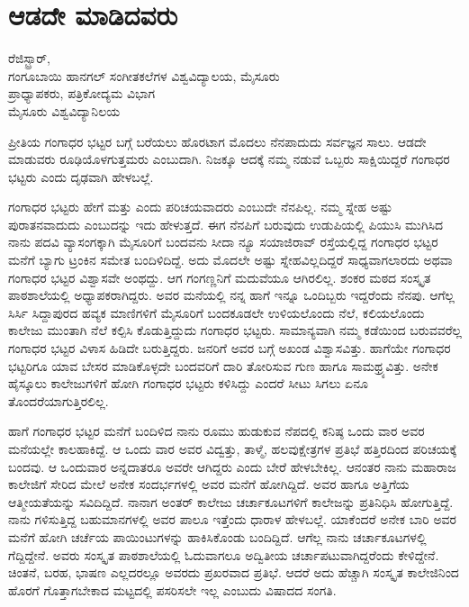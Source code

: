 {\fontsize{14}{16}\selectfont
\chapter{ಆಡದೇ ಮಾಡಿದವರು}

\begin{center}
\smallskip

ರೆಜಿಸ್ಟ್ರಾರ್, \\ಗಂಗೂಬಾಯಿ ಹಾನಗಲ್ ಸಂಗೀತಕಲೆಗಳ ವಿಶ್ವವಿದ್ಯಾಲಯ, ಮೈಸೂರು\\
ಪ್ರಾಧ್ಯಾಪಕರು, ಪತ್ರಿಕೋದ್ಯಮ ವಿಭಾಗ\\
ಮೈಸೂರು ವಿಶ್ವವಿದ್ಯಾನಿಲಯ
\addrule
\end{center}

ಪ್ರೀತಿಯ ಗಂಗಾಧರ ಭಟ್ಟರ ಬಗ್ಗೆ ಬರೆಯಲು ಹೊರಟಾಗ ಮೊದಲು ನೆನಪಾದುದು ಸರ್ವಜ್ಞನ ಸಾಲು. ಆಡದೇ ಮಾಡುವರು ರೂಢಿಯೊಳಗುತ್ತಮರು ಎಂಬುದಾಗಿ. ನಿಜಕ್ಕೂ ಆದಕ್ಕೆ ನಮ್ಮ ನಡುವೆ ಒಬ್ಬರು ಸಾಕ್ಷಿಯಿದ್ದರೆ ಗಂಗಾಧರ ಭಟ್ಟರು ಎಂದು ದೃಢವಾಗಿ ಹೇಳಬಲ್ಲೆ.

ಗಂಗಾಧರ ಭಟ್ಟರು ಹೇಗೆ ಮತ್ತು ಎಂದು ಪರಿಚಯವಾದರು ಎಂಬುದೇ ನೆನಪಿಲ್ಲ. ನಮ್ಮ ಸ್ನೇಹ ಅಷ್ಟು ಪುರಾತನವಾದುದು ಎಂಬುದನ್ನು ಇದು ಹೇಳುತ್ತದೆ. ಈಗ ನೆನಪಿಗೆ ಬರುವುದು ಉಡುಪಿಯಲ್ಲಿ ಪಿಯುಸಿ ಮುಗಿಸಿದ ನಾನು ಪದವಿ ವ್ಯಾಸಂಗಕ್ಕಾಗಿ ಮೈಸೂರಿಗೆ ಬಂದವನು ಸೀದಾ ನ್ಯೂ ಸಯಾಜಿರಾವ್ ರಸ್ತೆಯಲ್ಲಿದ್ದ ಗಂಗಾಧರ ಭಟ್ಟರ ಮನೆಗೆ ಬ್ಯಾಗು ಟ್ರಂಕಿನ ಸಮೇತ ಬಂದಿಳಿದಿದ್ದೆ. ಅದು ಮೊದಲೇ ಅಷ್ಟು ಸ್ನೇಹವಿಲ್ಲದಿದ್ದರೆ ಸಾಧ್ಯವಾಗಲಾರದು ಅಥವಾ ಗಂಗಾಧರ ಭಟ್ಟರ ವಿಶ್ವಾಸವೇ ಅಂಥದ್ದು. ಆಗ ಗಂಗಣ್ಣನಿಗೆ ಮದುವೆಯೂ ಆಗಿರಲಿಲ್ಲ. ಶಂಕರ ಮಠದ ಸಂಸ್ಕೃತ ಪಾಠಶಾಲೆಯಲ್ಲಿ ಅಧ್ಯಾಪಕರಾಗಿದ್ದರು. ಅವರ ಮನೆಯಲ್ಲಿ ನನ್ನ ಹಾಗೆ ಇನ್ನೂ ಒಂದಿಬ್ಬರು ಇದ್ದರೆಂದು ನೆನಪು. ಆಗೆಲ್ಲ ಸಿರ್ಸಿ  \enginline{-}  ಸಿದ್ದಾಪುರದ ಹವ್ಯಕ ಮಾಣಿಗಳಿಗೆ ಮೈಸೂರಿಗೆ ಬಂದಕೂಡಲೇ ಉಳಿಯಲೊಂದು ನೆಲೆ, ಕಲಿಯಲೊಂದು ಕಾಲೇಜು ಮುಂತಾಗಿ ನೆಲೆ ಕಲ್ಪಿಸಿ ಕೊಡುತ್ತಿದ್ದುದು ಗಂಗಾಧರ ಭಟ್ಟರು. ಸಾಮಾನ್ಯವಾಗಿ ನಮ್ಮ ಕಡೆಯಿಂದ ಬರುವವರೆಲ್ಲ ಗಂಗಾಧರ ಭಟ್ಟರ ವಿಳಾಸ ಹಿಡಿದೇ ಬರುತ್ತಿದ್ದರು. ಜನರಿಗೆ ಅವರ ಬಗ್ಗೆ ಅಖಂಡ ವಿಶ್ವಾಸವಿತ್ತು. ಹಾಗೆಯೇ ಗಂಗಾಧರ ಭಟ್ಟರಿಗೂ ಯಾವ ಬೇಸರ ಮಾಡಿಕೊಳ್ಳದೇ ಬಂದವರಿಗೆ ದಾರಿ ತೋರಿಸುವ ಗುಣ ಹಾಗೂ ಸಾಮಥ್ರ್ಯವಿತ್ತು. ಅನೇಕ ಹೈಸ್ಕೂಲು ಕಾಲೇಜುಗಳಿಗೆ ಹೋಗಿ ಗಂಗಾಧರ ಭಟ್ಟರು ಕಳಿಸಿದ್ದು ಎಂದರೆ ಸೀಟು ಸಿಗಲು ಏನೂ ತೊಂದರೆಯಾಗುತ್ತಿರಲಿಲ್ಲ.

ಹಾಗೆ ಗಂಗಾಧರ ಭಟ್ಟರ ಮನೆಗೆ ಬಂದಿಳಿದ ನಾನು ರೂಮು ಹುಡುಕುವ ನೆಪದಲ್ಲಿ ಕನಿಷ್ಠ ಒಂದು ವಾರ ಅವರ ಮನೆಯಲ್ಲೇ ಕಾಲಹಾಕಿದ್ದೆ. ಆ ಒಂದು ವಾರ ಅವರ ವಿದ್ವತ್ತು, ತಾಳ್ಮೆ, ಹಲವುಕ್ಷೇತ್ರಗಳ ಪ್ರತಿಭೆ ಹತ್ತಿರದಿಂದ ಪರಿಚಯಕ್ಕೆ ಬಂದವು. ಆ ಒಂದುವಾರ ಅನ್ನದಾತರೂ ಅವರೇ ಆಗಿದ್ದರು ಎಂದು ಬೇರೆ ಹೇಳಬೇಕಿಲ್ಲ. ಆನಂತರ ನಾನು ಮಹಾರಾಜ ಕಾಲೇಜಿಗೆ ಸೇರಿದ ಮೇಲೆ ಅನೇಕ ಸಂದರ್ಭಗಳಲ್ಲಿ ಅವರ ಮನೆಗೆ ಹೋಗಿದ್ದಿದೆ. ಅವರ ಹಾಗೂ ಅತ್ತಿಗೆಯ ಆತ್ಮೀಯತೆಯನ್ನು ಸವಿದಿದ್ದಿದೆ. ನಾನಾಗ ಅಂತರ್ ಕಾಲೇಜು ಚರ್ಚಾಕೂಟಗಳಿಗೆ ಕಾಲೇಜನ್ನು ಪ್ರತಿನಿಧಿಸಿ ಹೋಗುತ್ತಿದ್ದೆ. ನಾನು ಗಳಿಸುತ್ತಿದ್ದ ಬಹುಮಾನಗಳಲ್ಲಿ ಅವರ ಪಾಲೂ ಇತ್ತೆಂದು ಧಾರಾಳ ಹೇಳಬಲ್ಲೆ. ಯಾಕೆಂದರೆ ಅನೇಕ ಬಾರಿ ಅವರ ಮನೆಗೆ ಹೋಗಿ ಚರ್ಚೆಯ ಪಾಯಿಂಟುಗಳನ್ನು ಹಾಕಿಸಿಕೊಂಡು ಬಂದಿದ್ದಿದೆ. ಆಗೆಲ್ಲ ನಾನು ಚರ್ಚಾಕೂಟಗಳಲ್ಲಿ ಗೆದ್ದಿದ್ದೇನೆ. ಅವರು ಸಂಸ್ಕೃತ ಪಾಠಶಾಲೆಯಲ್ಲಿ ಓದುವಾಗಲೂ ಅದ್ವಿತೀಯ ಚರ್ಚಾಪಟುವಾಗಿದ್ದರೆಂದು ಕೇಳಿದ್ದೇನೆ. ಚಿಂತನೆ, ಬರಹ, ಭಾಷಣ ಎಲ್ಲದರಲ್ಲೂ ಅವರದು ಪ್ರಖರವಾದ ಪ್ರತಿಭೆ. ಆದರೆ ಅದು ಹೆಚ್ಚಾಗಿ ಸಂಸ್ಕೃತ ಕಾಲೇಜಿನಿಂದ ಹೊರಗೆ ಗೊತ್ತಾಗಬೇಕಾದ ಮಟ್ಟದಲ್ಲಿ ಪಸರಿಸಲೇ ಇಲ್ಲ ಎಂಬುದು ವಿಷಾದದ ಸಂಗತಿ.

}
